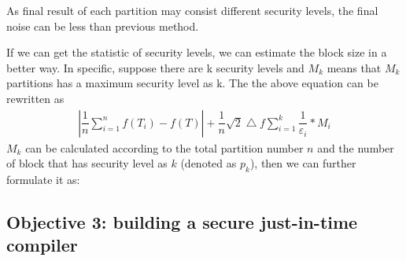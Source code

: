 As final result of each partition may consist
different security levels, the final noise can be less than previous method.

If we can get the statistic of security levels, we can estimate the block
size in a better way. In specific, suppose there are k security levels and
$M_k$ means that $M_k$ partitions has a maximum security level as k. The the
above equation can be rewritten as
\begin{align}
  |\dfrac{1}{n}\sum\limits_{i=1}^n f(T_i) - f(T)| +  
\dfrac{1}{n}\sqrt{2}\bigtriangleup{f}\sum\limits_{i=1}^k\dfrac{1}{\varepsilon_i} 
* M_i
\end{align}
$M_k$ can be calculated according to the total partition number $n$ and
the number of block that has security level as $k$ (denoted as $p_k$), then
we can further formulate it as:




\vspace{-.15in}\subsection{Objective 3: building a 
secure just-in-time compiler}\label{sec:obj3}\vspace{-.075in}


